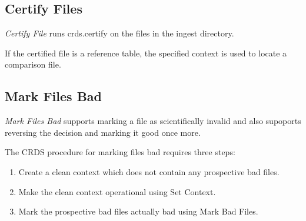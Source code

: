 \documentclass[letterpaper,10pt,english]{sphinxmanual}
\begin{document}
\subsection{Certify Files}
\label{web_site_use:certify-files}
\emph{Certify File} runs crds.certify on the files in the ingest directory.
\begin{figure}[htbp]
\centering

\end{figure}

If the certified file is a reference table,  the specified context is used to
locate a comparison file.


\subsection{Mark Files Bad}
\label{web_site_use:mark-files-bad}
\emph{Mark Files Bad} supports marking a file as scientifically invalid and
also supoports reversing the decision and marking it good once more.

The CRDS procedure for marking files bad requires three steps:
\begin{enumerate}
\item {} 
Create a clean context which does not contain any prospective bad files.

\item {} 
Make the clean context operational using Set Context.

\item {} 
Mark the prospective bad files actually bad using Mark Bad Files.

\end{enumerate}
\end{document}
